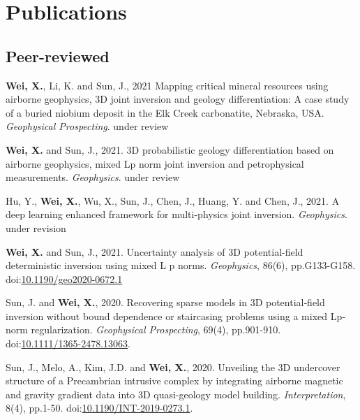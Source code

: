 \documentclass[11pt, a4paper]{article}
\newcommand{\LastName}{Wei}
\newcommand{\Initials}{X}
\newcommand{\Wei}{\textbf{\LastName, \Initials.}}  %
\newcommand{\WeiSun}{\textbf{\LastName, \Initials.} and Sun, J.}  %
\newcommand{\Review}{under review}
\newcommand{\Revision}{under revision}
\newcommand{\DOI}[1]{doi:\href{https://doi.org/#1}{#1}}
\begin{document}
\section*{Publications}
\subsection*{Peer-reviewed}
\begin{etaremune}

	\item
	\Wei, Li, K. and Sun, J., 2021 Mapping critical mineral resources using airborne geophysics, 3D joint inversion and geology differentiation: A case study of a buried niobium deposit in the Elk Creek carbonatite, Nebraska, USA. \emph{Geophysical Prospecting}. \Review

	\item
	\WeiSun, 2021. 3D probabilistic geology differentiation based on airborne geophysics, mixed Lp norm joint inversion and petrophysical measurements. \emph{Geophysics}. \Review

	\item
	Hu, Y., \Wei, Wu, X., Sun, J., Chen, J., Huang, Y. and Chen, J., 2021. A deep learning enhanced framework for multi-physics joint inversion. \emph{Geophysics}. \Revision

	\item
	\WeiSun, 2021. Uncertainty analysis of 3D potential-field deterministic inversion using mixed L p norms. \emph{Geophysics}, 86(6), pp.G133-G158.
	\DOI{10.1190/geo2020-0672.1}

	\item
	Sun, J. and \Wei, 2020. Recovering sparse models in 3D potential‐field inversion without bound dependence or staircasing problems using a mixed Lp‐norm regularization. \emph{Geophysical Prospecting}, 69(4), pp.901-910.
	\DOI{10.1111/1365-2478.13063}.

	\item
	Sun, J., Melo, A., Kim, J.D. and \Wei, 2020. Unveiling the 3D undercover structure of a Precambrian intrusive complex by integrating airborne magnetic and gravity gradient data into 3D quasi-geology model building. \emph{Interpretation}, 8(4), pp.1-50.
	\DOI{10.1190/INT-2019-0273.1}.

\end{etaremune}

%
%
\end{document}
